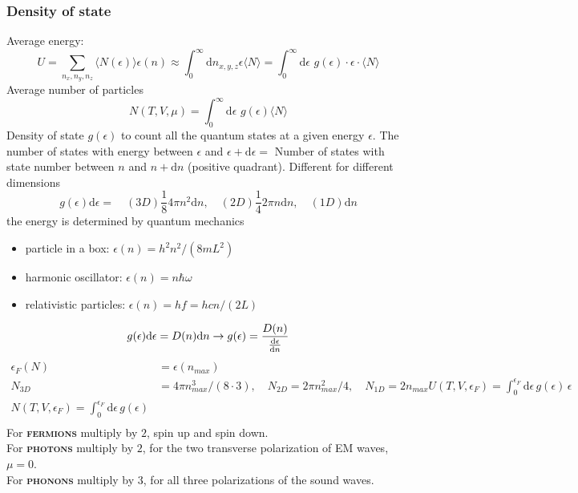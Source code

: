 \documentclass[a4paper, norsk, 8pt]{article}
\begin{document}
\begin{multicols*}{3}
\subsubsection*{\scriptsize  Density of state}
Average energy:
\begin{equation*}
  U = \sum_{n_x,n_y,n_z} \langle N(\epsilon) \rangle \epsilon(n) \approx \int_0^{\infty}\mbox{d}n_{x,y,z}\epsilon \langle N \rangle = \int_{0}^{\infty}\mbox{d}\epsilon\,\, g(\epsilon)\cdot \epsilon \cdot \langle N \rangle
\end{equation*}
Average number of particles
\begin{equation*}
  N(T,V,\mu) = \int_0^{\infty} \mbox{d}\epsilon\,\, g(\epsilon) \langle N \rangle
\end{equation*}
Density of state $g(\epsilon)$ to count all the quantum states at a given energy $\epsilon$. The number of states with energy between $\epsilon$ and $\epsilon + \mbox{d}\epsilon = $ Number of states with state number between $n$ and $n+\mbox{d}n$ (positive quadrant). Different for different dimensions
\begin{equation}
  \boxed{g(\epsilon) \mbox{d}\epsilon=} \quad(3D) \frac{1}{8}4\pi n^2 \mbox{d}n, \quad(2D) \frac{1}{4}2\pi n \mbox{d}n, \quad(1D)\mbox{d}n
\end{equation}
the energy is determined by quantum mechanics
\begin{itemize}
  \item particle in a box: $\epsilon(n) = h^2n^2/(8mL^2)$
  \item harmonic oscillator: $\epsilon(n) = n\hbar\omega$
  \item relativistic particles: $\epsilon(n) = hf = hcn/(2L)$
\end{itemize}
\begin{equation*}
    g(\epsilon)\mbox{d}\epsilon = D(n)\mbox{d}n \rightarrow g(\epsilon) = \frac{D(n)}{\dv{\epsilon}{n}}
\end{equation*}
\begin{align*}
  \epsilon_F(N) &= \epsilon(n_{max}) \\
  N_{3D} &= 4\pi n_{max}^3/(8\cdot 3), \quad N_{2D} = 2\pi n_{max}^2/4, \quad N_{1D} = 2n_{max}
  U(T,V,\epsilon_F) = \int_0^{\epsilon_F} \mbox{d}\epsilon \, g(\epsilon)\, \epsilon \\
  N(T,V,\epsilon_F) = \int_0^{\epsilon_F} \mbox{d}\epsilon \, g(\epsilon) \\

\end{align*}
For \textbf{\textsc{fermions}} multiply by $2$, spin up and spin down.\\
For \textbf{\textsc{photons}} multiply by $2$, for the two transverse polarization of EM waves, $\mu=0$.\\
For \textbf{\textsc{phonons}} multiply by $3$, for all three polarizations of the sound waves.


\end{multicols*}
\end{document}
